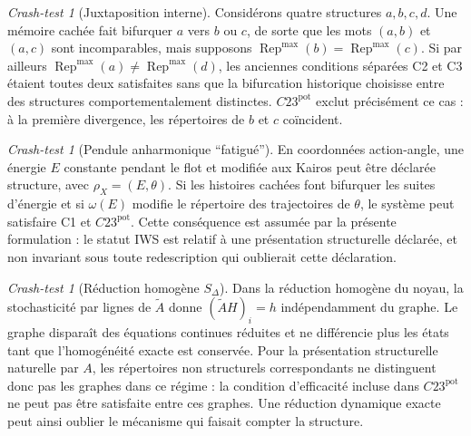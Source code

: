 \documentclass[11pt,a4paper]{article}
\theoremstyle{definition}
\theoremstyle{remark}
\newtheorem{crashtest}[definition]{Crash-test}
\newcommand{\Rep}{\operatorname{Rep}}
\begin{document}
\begin{crashtest}[Juxtaposition interne]
Considérons quatre structures $a,b,c,d$. Une mémoire cachée fait bifurquer $a$ vers $b$ ou $c$, de sorte que les mots $(a,b)$ et $(a,c)$ sont incomparables, mais supposons $\Rep^{\max}(b)=\Rep^{\max}(c)$. Si par ailleurs $\Rep^{\max}(a)\neq\Rep^{\max}(d)$, les anciennes conditions séparées C2 et C3 étaient toutes deux satisfaites sans que la bifurcation historique choisisse entre des structures comportementalement distinctes. $C23^{\mathrm{pot}}$ exclut précisément ce cas : à la première divergence, les répertoires de $b$ et $c$ coïncident.
\end{crashtest}

\begin{crashtest}[Pendule anharmonique ``fatigué'']
En coordonnées action-angle, une énergie $E$ constante pendant le flot et modifiée aux Kairos peut être déclarée structure, avec $\rho_X=(E,\theta)$. Si les histoires cachées font bifurquer les suites d'énergie et si $\omega(E)$ modifie le répertoire des trajectoires de $\theta$, le système peut satisfaire C1 et $C23^{\mathrm{pot}}$. Cette conséquence est assumée par la présente formulation : le statut IWS est relatif à une présentation structurelle déclarée, et non invariant sous toute redescription qui oublierait cette déclaration.
\end{crashtest}

\begin{crashtest}[Réduction homogène $S_\Delta$]
Dans la réduction homogène du noyau, la stochasticité par lignes de $\widetilde A$ donne $(\widetilde AH)_i=h$ indépendamment du graphe. Le graphe disparaît des équations continues réduites et ne différencie plus les états tant que l'homogénéité exacte est conservée. Pour la présentation structurelle naturelle par $A$, les répertoires non structurels correspondants ne distinguent donc pas les graphes dans ce régime : la condition d'efficacité incluse dans $C23^{\mathrm{pot}}$ ne peut pas être satisfaite entre ces graphes. Une réduction dynamique exacte peut ainsi oublier le mécanisme qui faisait compter la structure.
\end{crashtest}
\end{document}
